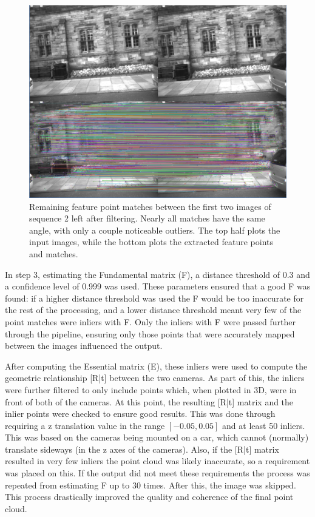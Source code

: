 \documentclass[11pt]{article}
\begin{document}
\begin{figure}[h]
	\centering
	\includegraphics[scale=0.42]{featurePointMatches}
	\caption{Remaining feature point matches between the first two images of sequence 2 left after filtering. Nearly all matches have the same angle, with only a couple noticeable outliers. The top half plots the input images, while the bottom plots the extracted feature points and matches.}
	\label{fig:featurePointMatches}
\end{figure}

In step 3, estimating the Fundamental matrix (F), a distance threshold of 0.3 and a confidence level of 0.999 was used. These parameters ensured that a good F was found: if a higher distance threshold was used the F would be too inaccurate for the rest of the processing, and a lower distance threshold meant very few of the point matches were inliers with F. Only the inliers with F were passed further through the pipeline, ensuring only those points that were accurately mapped between the images influenced the output.

After computing the Essential matrix (E), these inliers were used to compute the geometric relationship [R|t] between the two cameras. As part of this, the inliers were further filtered to only include points which, when plotted in 3D, were in front of both of the cameras. At this point, the resulting [R|t] matrix and the inlier points were checked to ensure good results. This was done through requiring a z translation value in the range $[-0.05, 0.05]$ and at least 50 inliers. This was based on the cameras being mounted on a car, which cannot (normally) translate sideways (in the z axes of the cameras). Also, if the [R|t] matrix resulted in very few inliers the point cloud was likely inaccurate, so a requirement was placed on this. If the output did not meet these requirements the process was repeated from estimating F up to 30 times. After this, the image was skipped. This process drastically improved the quality and coherence of the final point cloud.
\end{document}
